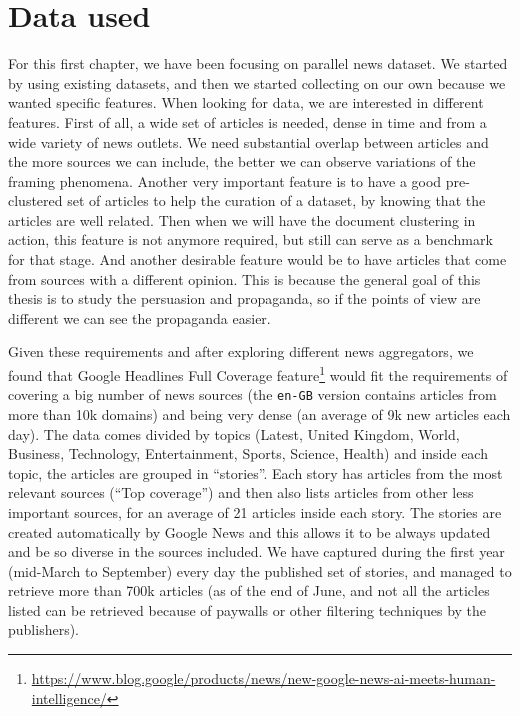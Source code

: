 \section{\statusgreen Data used}
For this first chapter, we have been focusing on parallel news dataset. We started by using existing datasets, and then we started collecting on our own because we wanted specific features.
When looking for data, we are interested in different features.
First of all, a wide set of articles is needed, dense in time and from a wide variety of news outlets. We need substantial overlap between articles and the more sources we can include, the better we can observe variations of the framing phenomena.
Another very important feature is to have a good pre-clustered set of articles to help the curation of a dataset, %
by knowing that the articles are well related.
Then when we will have the document clustering in action, this feature is not anymore required, but still can serve as a benchmark for that stage.
And another desirable feature would be to have articles that come from sources with a different opinion. %
This is because the general goal of this thesis is to study the persuasion and propaganda, so if the points of view are different we can see the propaganda easier.

Given these requirements and after exploring different news aggregators, we found that Google Headlines Full Coverage feature\footnote{\url{https://www.blog.google/products/news/new-google-news-ai-meets-human-intelligence/}} would fit the requirements of covering a big number of news sources (the \texttt{en-GB} version contains articles from more than 10k domains) and being very dense (an average of 9k new articles each day).
The data comes divided by topics (Latest, United Kingdom, World, Business, Technology, Entertainment, Sports, Science, Health) and inside each topic, the articles are grouped in ``stories''. Each story has articles from the most relevant sources (``Top coverage'') and then also lists articles from other less important sources, for an average of 21 articles inside each story.
The stories are created automatically by Google News and this allows it to be always updated and be so diverse in the sources included.
We have captured during the first year (mid-March to September) every day the published set of stories, and managed to retrieve more than 700k articles (as of the end of June, and not all the articles listed can be retrieved because of paywalls or other filtering techniques by the publishers).

